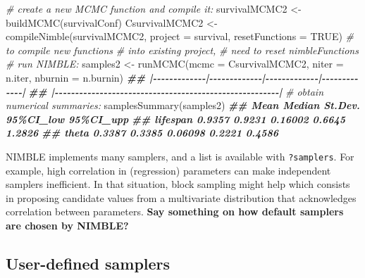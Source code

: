 \documentclass[
  12pt,
]{krantz}
\newenvironment{Shaded}{\begin{snugshade}}{\end{snugshade}}
\newcommand{\AttributeTok}[1]{\textcolor[rgb]{0.77,0.63,0.00}{#1}}
\newcommand{\CommentTok}[1]{\textcolor[rgb]{0.56,0.35,0.01}{\textit{#1}}}
\newcommand{\ConstantTok}[1]{\textcolor[rgb]{0.00,0.00,0.00}{#1}}
\newcommand{\DocumentationTok}[1]{\textcolor[rgb]{0.56,0.35,0.01}{\textbf{\textit{#1}}}}
\newcommand{\FunctionTok}[1]{\textcolor[rgb]{0.00,0.00,0.00}{#1}}
\newcommand{\NormalTok}[1]{#1}
\newcommand{\OtherTok}[1]{\textcolor[rgb]{0.56,0.35,0.01}{#1}}
\begin{document}
\begin{Shaded}
\begin{Highlighting}[]
\CommentTok{\# create a new MCMC function and compile it:}
\NormalTok{survivalMCMC2 }\OtherTok{\textless{}{-}} \FunctionTok{buildMCMC}\NormalTok{(survivalConf)}
\NormalTok{CsurvivalMCMC2 }\OtherTok{\textless{}{-}} \FunctionTok{compileNimble}\NormalTok{(survivalMCMC2, }
                                \AttributeTok{project =}\NormalTok{ survival,}
                                \AttributeTok{resetFunctions =} \ConstantTok{TRUE}\NormalTok{) }\CommentTok{\# to compile new functions }
                                                       \CommentTok{\# into existing project, }
                                                       \CommentTok{\# need to reset nimbleFunctions}
\CommentTok{\# run NIMBLE:}
\NormalTok{samples2 }\OtherTok{\textless{}{-}} \FunctionTok{runMCMC}\NormalTok{(}\AttributeTok{mcmc =}\NormalTok{ CsurvivalMCMC2, }
                    \AttributeTok{niter =}\NormalTok{ n.iter,}
                    \AttributeTok{nburnin =}\NormalTok{ n.burnin)}
\DocumentationTok{\#\# |{-}{-}{-}{-}{-}{-}{-}{-}{-}{-}{-}{-}{-}|{-}{-}{-}{-}{-}{-}{-}{-}{-}{-}{-}{-}{-}|{-}{-}{-}{-}{-}{-}{-}{-}{-}{-}{-}{-}{-}|{-}{-}{-}{-}{-}{-}{-}{-}{-}{-}{-}{-}{-}|}
\DocumentationTok{\#\# |{-}{-}{-}{-}{-}{-}{-}{-}{-}{-}{-}{-}{-}{-}{-}{-}{-}{-}{-}{-}{-}{-}{-}{-}{-}{-}{-}{-}{-}{-}{-}{-}{-}{-}{-}{-}{-}{-}{-}{-}{-}{-}{-}{-}{-}{-}{-}{-}{-}{-}{-}{-}{-}{-}{-}|}
\CommentTok{\# obtain numerical summaries:}
\FunctionTok{samplesSummary}\NormalTok{(samples2)}
\DocumentationTok{\#\#            Mean Median St.Dev. 95\%CI\_low 95\%CI\_upp}
\DocumentationTok{\#\# lifespan 0.9357 0.9231 0.16002    0.6645    1.2826}
\DocumentationTok{\#\# theta    0.3387 0.3385 0.06098    0.2221    0.4586}
\end{Highlighting}
\end{Shaded}

NIMBLE implements many samplers, and a list is available with \texttt{?samplers}. For example, high correlation in (regression) parameters can make independent samplers inefficient. In that situation, block sampling might help which consists in proposing candidate values from a multivariate distribution that acknowledges correlation between parameters. \textbf{Say something on how default samplers are chosen by NIMBLE?}

\hypertarget{user-defined-samplers}{%
\subsection{User-defined samplers}\label{user-defined-samplers}}
\end{document}
